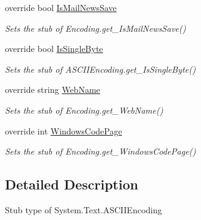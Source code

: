 \begin{DoxyCompactItemize}
override bool \hyperlink{class_system_1_1_text_1_1_fakes_1_1_stub_a_s_c_i_i_encoding_a344bba74a15de48361ae4c7778d66f20}{Is\-Mail\-News\-Save}
\begin{DoxyCompactList}\small\item\em Sets the stub of Encoding.\-get\-\_\-\-Is\-Mail\-News\-Save()\end{DoxyCompactList}\item 
override bool \hyperlink{class_system_1_1_text_1_1_fakes_1_1_stub_a_s_c_i_i_encoding_a90b41fee041a40492ca50410f47ccaf6}{Is\-Single\-Byte}
\begin{DoxyCompactList}\small\item\em Sets the stub of A\-S\-C\-I\-I\-Encoding.\-get\-\_\-\-Is\-Single\-Byte()\end{DoxyCompactList}\item 
override string \hyperlink{class_system_1_1_text_1_1_fakes_1_1_stub_a_s_c_i_i_encoding_ae8edc8190913c80f7f3d34751f744e4c}{Web\-Name}
\begin{DoxyCompactList}\small\item\em Sets the stub of Encoding.\-get\-\_\-\-Web\-Name()\end{DoxyCompactList}\item 
override int \hyperlink{class_system_1_1_text_1_1_fakes_1_1_stub_a_s_c_i_i_encoding_aab240d32c691877d3391c454f45933ef}{Windows\-Code\-Page}
\begin{DoxyCompactList}\small\item\em Sets the stub of Encoding.\-get\-\_\-\-Windows\-Code\-Page()\end{DoxyCompactList}\end{DoxyCompactItemize}


\subsection{Detailed Description}
Stub type of System.\-Text.\-A\-S\-C\-I\-I\-Encoding



